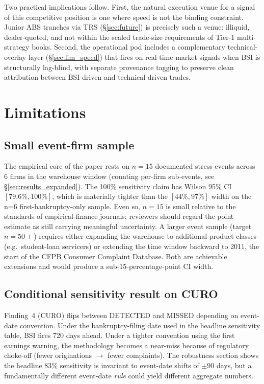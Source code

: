 \documentclass[11pt,a4paper]{article}
\begin{document}
Two practical implications follow. First, the natural execution venue for a signal of this competitive position is one where speed is not the binding constraint. Junior ABS tranches via TRS (§\ref{sec:future}) is precisely such a venue: illiquid, dealer-quoted, and not within the scaled trade-size requirements of Tier-1 multi-strategy books. Second, the operational pod includes a complementary technical-overlay layer (§\ref{sec:lim_speed}) that fires on real-time market signals when BSI is structurally lag-blind, with separate provenance tagging to preserve clean attribution between BSI-driven and technical-driven trades.

\section{Limitations}\label{sec:limitations}

\subsection{Small event-firm sample}\label{sec:lim_n}

The empirical core of the paper rests on $n=15$ documented stress events across 6 firms in the warehouse window (counting per-firm sub-events, see §\ref{sec:results_expanded}). The 100\% sensitivity claim has Wilson 95\% CI $[79.6\%, 100\%]$, which is materially tighter than the $[44\%, 97\%]$ width on the n=6 first-bankruptcy-only sample. Even so, $n=15$ is small relative to the standards of empirical-finance journals; reviewers should regard the point estimate as still carrying meaningful uncertainty. A larger event sample (target $n=50+$) requires either expanding the warehouse to additional product classes (e.g.\ student-loan servicers) or extending the time window backward to 2011, the start of the CFPB Consumer Complaint Database. Both are achievable extensions and would produce a sub-15-percentage-point CI width.

\subsection{Conditional sensitivity result on CURO}

Finding~4 (CURO) flips between DETECTED and MISSED depending on event-date convention. Under the bankruptcy-filing date used in the headline sensitivity table, BSI fires 720 days ahead. Under a tighter convention using the first earnings warning, the methodology becomes a near-miss because of regulatory choke-off (fewer originations $\to$ fewer complaints). The robustness section shows the headline 83\% sensitivity is invariant to event-date shifts of $\pm 90$ days, but a fundamentally different event-date \emph{rule} could yield different aggregate numbers.
\end{document}
